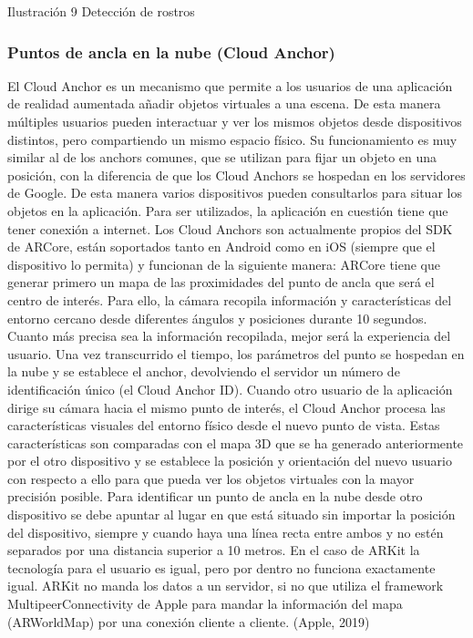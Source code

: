 Ilustración 9 Detección de rostros

\subsubsection{Puntos de ancla en la nube (Cloud Anchor)}
El Cloud Anchor es un mecanismo que permite a los usuarios de una aplicación de realidad aumentada añadir objetos virtuales a una escena. De esta manera múltiples usuarios pueden interactuar y ver los mismos objetos desde dispositivos distintos, pero compartiendo un mismo espacio físico. Su funcionamiento es muy similar al de los anchors comunes, que se utilizan para fijar un objeto en una posición, con la diferencia de que los Cloud Anchors se hospedan en los servidores de Google. De esta manera varios dispositivos pueden consultarlos para situar los objetos en la aplicación.
Para ser utilizados, la aplicación en cuestión tiene que tener conexión a internet.
Los Cloud Anchors son actualmente propios del SDK de ARCore, están soportados tanto en Android como en iOS (siempre que el dispositivo lo permita) y funcionan de la siguiente manera: ARCore tiene que generar primero un mapa de las proximidades del punto de ancla que será el centro de interés. Para ello, la cámara recopila información y características del entorno cercano desde diferentes ángulos y posiciones durante 10 segundos. Cuanto más precisa sea la información recopilada, mejor será la experiencia del usuario. Una vez transcurrido el tiempo, los parámetros del punto se hospedan en la nube y se establece el anchor, devolviendo el servidor un número de identificación único (el Cloud Anchor ID). Cuando otro usuario de la aplicación dirige su cámara hacia el mismo punto de interés, el Cloud Anchor procesa las características visuales del entorno físico desde el nuevo punto de vista. Estas características son comparadas con el mapa 3D que se ha generado anteriormente por el otro dispositivo y se establece la posición y orientación del nuevo usuario con respecto a ello para que pueda ver los objetos virtuales con la mayor precisión posible.
Para identificar un punto de ancla en la nube desde otro dispositivo se debe apuntar al lugar en que está situado sin importar la posición del dispositivo, siempre y cuando haya una línea recta entre ambos y no estén separados por una distancia superior a 10 metros.
En el caso de ARKit la tecnología para el usuario es igual, pero por dentro no funciona exactamente igual. ARKit no manda los datos a un servidor, si no que utiliza el framework MultipeerConnectivity de Apple para mandar la información del mapa (ARWorldMap) por una conexión cliente a cliente. (Apple, 2019)
